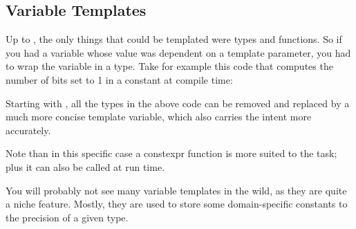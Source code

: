\subsection{Variable Templates}

Up to , the only things that could be templated were types and
functions. So if you had a variable whose value was dependent on a
template parameter, you had to wrap the variable in a type. Take for
example this code that computes the number of bits set to 1 in a
constant at compile time:



Starting with , all the types in the above code can be removed
and replaced by a much more concise template variable, which also
carries the intent more accurately.



Note than in this specific case a constexpr function
 is more suited to the task; plus it can also be
called at run time.

You will probably not see many variable templates in the wild, as they
are quite a niche feature. Mostly, they are used to store some
domain-specific constants to the precision of a given type.
